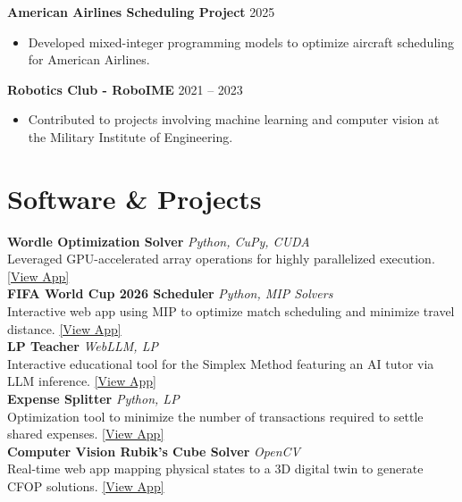 \documentclass[letterpaper,10pt]{article}
\newcommand{\dategray}[1]{\textcolor{textgray}{#1}}
\begin{document}
\textbf{American Airlines Scheduling Project} \hfill \dategray{2025}
\begin{itemize}[leftmargin=14pt, nosep, topsep=2pt, after=\vspace{4pt}]
    \item Developed mixed-integer programming models to optimize aircraft scheduling for American Airlines.
\end{itemize}

\textbf{Robotics Club - RoboIME} \hfill \dategray{2021 – 2023}
\begin{itemize}[leftmargin=14pt, nosep, topsep=2pt]
    \item Contributed to projects involving machine learning and computer vision at the Military Institute of Engineering.
\end{itemize}

\section{Software \& Projects}
\textbf{Wordle Optimization Solver} \hfill \textit{Python, CuPy, CUDA} \\
Leveraged GPU-accelerated array operations for highly parallelized execution. \href{https://igorlucindo.github.io/wordle-optimization-GAME/}{\color{darkblue}[View App]} \\[4pt]
\textbf{FIFA World Cup 2026 Scheduler} \hfill \textit{Python, MIP Solvers} \\
Interactive web app using MIP to optimize match scheduling and minimize travel distance. \href{https://igorlucindo.github.io/fifa-world-cup-2026-scheduler-APP/}{\color{darkblue}[View App]} \\[4pt]
\textbf{LP Teacher} \hfill \textit{WebLLM, LP} \\
Interactive educational tool for the Simplex Method featuring an AI tutor via LLM inference. \href{https://igorlucindo.github.io/lp-teacher-APP/}{\color{darkblue}[View App]} \\[4pt]
\textbf{Expense Splitter} \hfill \textit{Python, LP} \\
Optimization tool to minimize the number of transactions required to settle shared expenses. \href{https://igorlucindo.github.io/expense-splitter-APP/}{\color{darkblue}[View App]} \\[4pt]
\textbf{Computer Vision Rubik's Cube Solver} \hfill \textit{OpenCV} \\
Real-time web app mapping physical states to a 3D digital twin to generate CFOP solutions. \href{https://igorlucindo.github.io/rubiks-cube-tutorial-APP/}{\color{darkblue}[View App]}
\end{document}
